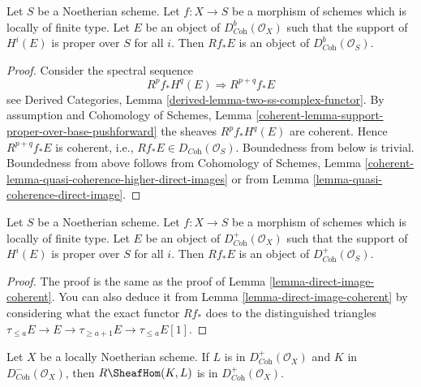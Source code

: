 \begin{lemma}
\label{lemma-direct-image-coherent}
Let $S$ be a Noetherian scheme. Let $f : X \to S$ be a morphism of schemes
which is locally of finite type. Let $E$ be an object of
$D^b_{\textit{Coh}}(\mathcal{O}_X)$ such that the support of $H^i(E)$
is proper over $S$ for all $i$.
Then $Rf_*E$ is an object of $D^b_{\textit{Coh}}(\mathcal{O}_S)$.
\end{lemma}

\begin{proof}
Consider the spectral sequence
$$
R^pf_*H^q(E) \Rightarrow R^{p + q}f_*E
$$
see Derived Categories, Lemma \ref{derived-lemma-two-ss-complex-functor}.
By assumption and
Cohomology of Schemes, Lemma
\ref{coherent-lemma-support-proper-over-base-pushforward}
the sheaves $R^pf_*H^q(E)$ are coherent. Hence
$R^{p + q}f_*E$ is coherent, i.e., $Rf_*E \in D_{\textit{Coh}}(\mathcal{O}_S)$.
Boundedness from below is trivial. Boundedness from above
follows from
Cohomology of Schemes, Lemma
\ref{coherent-lemma-quasi-coherence-higher-direct-images}
or from
Lemma \ref{lemma-quasi-coherence-direct-image}.
\end{proof}

\begin{lemma}
\label{lemma-direct-image-coherent-bdd-below}
Let $S$ be a Noetherian scheme. Let $f : X \to S$ be a morphism of schemes
which is locally of finite type. Let $E$ be an object of
$D^+_{\textit{Coh}}(\mathcal{O}_X)$ such that the support of $H^i(E)$
is proper over $S$ for all $i$.
Then $Rf_*E$ is an object of $D^+_{\textit{Coh}}(\mathcal{O}_S)$.
\end{lemma}

\begin{proof}
The proof is the same as the proof of
Lemma \ref{lemma-direct-image-coherent}.
You can also deduce it from
Lemma \ref{lemma-direct-image-coherent}
by considering what the exact functor $Rf_*$ does to
the distinguished triangles
$\tau_{\leq a}E \to E \to \tau_{\geq a + 1}E \to \tau_{\leq a}E[1]$.
\end{proof}

\begin{lemma}
\label{lemma-coherent-internal-hom}
Let $X$ be a locally Noetherian scheme. If $L$ is in
$D^+_{\textit{Coh}}(\mathcal{O}_X)$ and $K$ in
$D^-_{\textit{Coh}}(\mathcal{O}_X)$, then
$R\SheafHom(K, L)$ is in $D^+_{\textit{Coh}}(\mathcal{O}_X)$.
\end{lemma}

